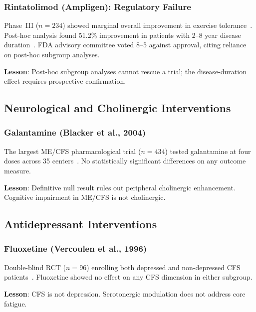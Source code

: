 \subsubsection{Rintatolimod (Ampligen): Regulatory Failure}

Phase~III ($n = 234$) showed marginal overall improvement in exercise tolerance~\cite{Strayer2020}. Post-hoc analysis found 51.2\% improvement in patients with 2--8 year disease duration~\cite{Strayer2020rintatolimod}. FDA advisory committee voted 8--5 against approval, citing reliance on post-hoc subgroup analyses.

\textbf{Lesson}: Post-hoc subgroup analyses cannot rescue a trial; the disease-duration effect requires prospective confirmation.

\subsection{Neurological and Cholinergic Interventions}
\label{subsec:neg-neurological}

\subsubsection{Galantamine (Blacker et al., 2004)}

The largest ME/CFS pharmacological trial ($n = 434$) tested galantamine at four doses across 35 centers~\cite{Blacker2004}. No statistically significant differences on any outcome measure.

\textbf{Lesson}: Definitive null result rules out peripheral cholinergic enhancement. Cognitive impairment in ME/CFS is not cholinergic.

\subsection{Antidepressant Interventions}
\label{subsec:neg-antidepressant}

\subsubsection{Fluoxetine (Vercoulen et al., 1996)}

Double-blind RCT ($n = 96$) enrolling both depressed and non-depressed CFS patients~\cite{Vercoulen1996}. Fluoxetine showed no effect on any CFS dimension in either subgroup.

\textbf{Lesson}: CFS is not depression. Serotonergic modulation does not address core fatigue.

